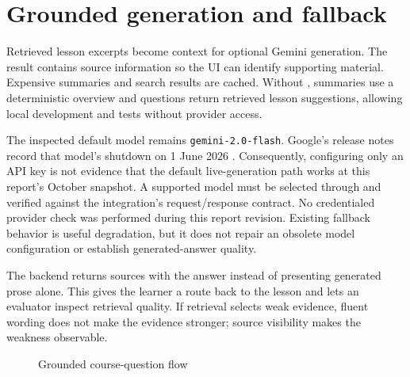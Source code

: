 \documentclass[12pt,a4paper,oneside]{report}
\begin{document}
\section{Grounded generation and fallback}
Retrieved lesson excerpts become context for optional Gemini generation. The result contains
source information so the UI can identify supporting material. Expensive summaries
and search results are cached. Without , summaries use a
deterministic overview and questions return retrieved lesson suggestions, allowing
local development and tests without provider access.

The inspected default model remains \texttt{gemini-2.0-flash}. Google's release
notes record that model's shutdown on 1 June 2026 \cite{geminireleases}. Consequently,
configuring only an API key is not evidence that the default live-generation path
works at this report's October snapshot. A supported model must be selected through
 and verified against the integration's request/response contract.
No credentialed provider check was performed during this report revision. Existing
fallback behavior is useful degradation, but it does not repair an obsolete model
configuration or establish generated-answer quality.

The backend returns sources with the answer instead of presenting generated prose
alone. This gives the learner a route back to the lesson and lets an evaluator inspect
retrieval quality. If retrieval selects weak evidence, fluent wording does not make
the evidence stronger; source visibility makes the weakness observable.

\begin{figure}[H]\centering
{}
\caption{Grounded course-question flow}\label{fig:rag}
\end{figure}
\end{document}
